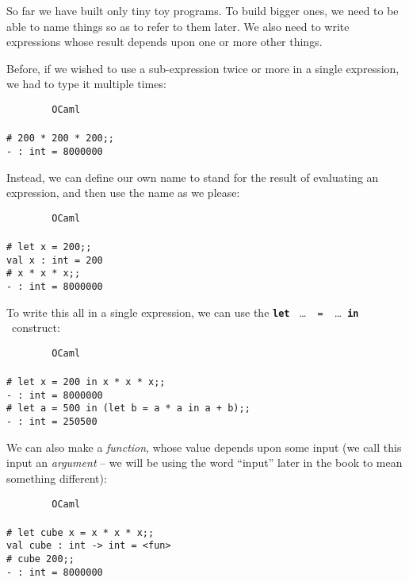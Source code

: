 \documentclass[]{book}
\newcommand{\smspace}{\vspace{4mm}}
\begin{document}
So far we have built only tiny toy programs. To build bigger ones, we need to be able to name things so as to refer to them later. We also need to write expressions whose result depends upon one or more other things.

Before, if we wished to use a sub-expression twice or more in a single expression, we had to type it multiple times:

\smspace
\noindent\verb!        OCaml!\\
\noindent\\
\noindent\verb!# 200 * 200 * 200;;!\\
\noindent\verb!- : int = 8000000!
\smspace

\noindent Instead, we can define our own name to stand for the result of evaluating an expression, and then use the name as we please:

\smspace
\noindent\verb!        OCaml!\\
\noindent\\
\noindent\verb!# let x = 200;;!\\
\noindent\verb!val x : int = 200!\\
\noindent\verb!# x * x * x;;!\\
\noindent\verb!- : int = 8000000!
\smspace

\noindent To write this all in a single expression, we can use the \texttt{\textbf{let}} \ \ldots \ \ \texttt{=}\ \ \ldots \ \texttt{\textbf{in}}  \ \!construct:

\smspace
\noindent\verb!        OCaml!\\
\noindent\\
\noindent\verb!# let x = 200 in x * x * x;;!\\
\noindent\verb!- : int = 8000000!\\
\noindent\verb!# let a = 500 in (let b = a * a in a + b);;!\\
\noindent\verb!- : int = 250500!
\smspace

\noindent We can also make a \textit{function}, whose value depends upon some input (we call this input an \textit{argument} -- we will be using the word ``input'' later in the book to mean something different):

\smspace
\noindent\verb!        OCaml!\\
\noindent\\
\noindent\verb!# let cube x = x * x * x;;!\\
\noindent\verb!val cube : int -> int = <fun>!\\
\noindent\verb!# cube 200;;!\\
\noindent\verb!- : int = 8000000!
\smspace
\end{document}
